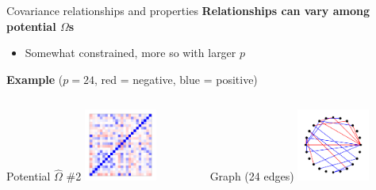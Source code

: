 \documentclass[professionalfonts]{beamer}
\begin{document}
\begin{frame}{Covariance relationships and properties}
\textbf{Relationships can vary among potential $\Omega$s}
\begin{itemize}
\item Somewhat constrained, more so with larger $p$
\end{itemize}
\textbf{Example} ($p = 24$, {\color{red} red} = negative, {\color{blue} blue} = positive)
\begin{columns}
\begin{column}{0.45\textwidth}
\begin{center}
Potential $\widehat{\Omega}$ \#2
\includegraphics[width=90px]{figs/example-alt2-cor.pdf}
\end{center}
\end{column}
\begin{column}{0.45\textwidth}
\begin{center}
Graph (24 edges)
\includegraphics[width=90px]{figs/example-alt2-graph.pdf}
\end{center}
\end{column}
\end{columns}
\end{frame}
\end{document}
